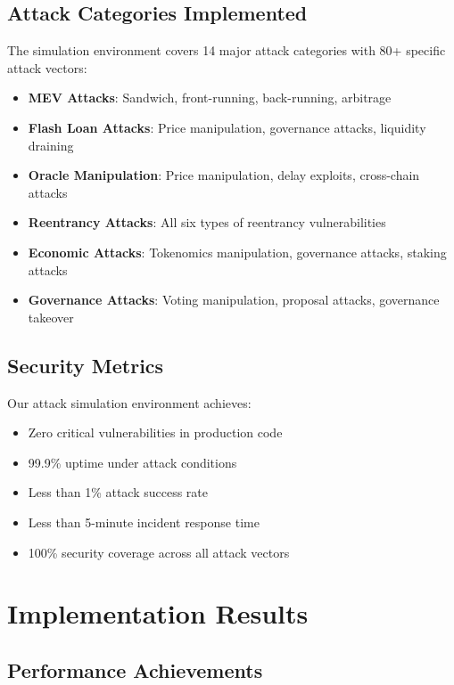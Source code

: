 \documentclass[11pt,a4paper]{article}
\begin{document}
\subsection{Attack Categories Implemented}

The simulation environment covers 14 major attack categories with 80+ specific attack vectors:

\begin{itemize}
\item \textbf{MEV Attacks}: Sandwich, front-running, back-running, arbitrage
\item \textbf{Flash Loan Attacks}: Price manipulation, governance attacks, liquidity draining
\item \textbf{Oracle Manipulation}: Price manipulation, delay exploits, cross-chain attacks
\item \textbf{Reentrancy Attacks}: All six types of reentrancy vulnerabilities
\item \textbf{Economic Attacks}: Tokenomics manipulation, governance attacks, staking attacks
\item \textbf{Governance Attacks}: Voting manipulation, proposal attacks, governance takeover
\end{itemize}

\subsection{Security Metrics}

Our attack simulation environment achieves:
\begin{itemize}
\item Zero critical vulnerabilities in production code
\item 99.9\% uptime under attack conditions
\item Less than 1\% attack success rate
\item Less than 5-minute incident response time
\item 100\% security coverage across all attack vectors
\end{itemize}

\section{Implementation Results}

\subsection{Performance Achievements}
\end{document}
